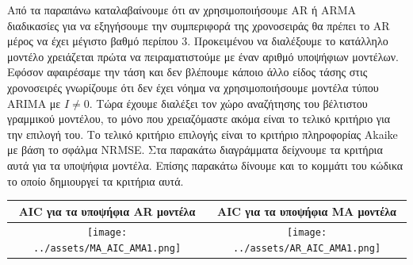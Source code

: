\documentclass[11pt,]{article}
\newenvironment{Shaded}{}{}
\newcommand{\CommentTok}[1]{\textcolor[rgb]{0.38,0.63,0.69}{\textit{#1}}}
\newcommand{\FloatTok}[1]{\textcolor[rgb]{0.25,0.63,0.44}{#1}}
\newcommand{\NormalTok}[1]{#1}
\newcommand{\StringTok}[1]{\textcolor[rgb]{0.25,0.44,0.63}{#1}}
\begin{document}
\begin{Shaded}
\end{Shaded}

Από τα παραπάνω καταλαβαίνουμε ότι αν χρησιμοποιήσουμε AR ή ARMA
διαδικασίες για να εξηγήσουμε την συμπεριφορά της χρονοσειράς θα πρέπει
το AR μέρος να έχει μέγιστο βαθμό περίπου 3. Προκειμένου να διαλέξουμε
το κατάλληλο μοντέλο χρειάζεται πρώτα να πειραματιστούμε με έναν αριθμό
υποψήφιων μοντέλων. Εφόσον αφαιρέσαμε την τάση και δεν βλέπουμε κάποιο
άλλο είδος τάσης στις χρονοσειρές γνωρίζουμε ότι δεν έχει νόημα να
χρησιμοποιήσουμε μοντέλα τύπου ARIMA με \(I \neq 0\). Τώρα έχουμε
διαλέξει τον χώρο αναζήτησης του βέλτιστου γραμμικού μοντέλου, το μόνο
που χρειαζόμαστε ακόμα είναι το τελικό κριτήριο για την επιλογή του. Το
τελικό κριτήριο επιλογής είναι το κριτήριο πληροφορίας Akaike με βάση το
σφάλμα NRMSE. Στα παρακάτω διαγράμματα δείχνουμε τα κριτήρια αυτά για τα
υποψήφια μοντέλα. Επίσης παρακάτω δίνουμε και το κομμάτι του κώδικα το
οποίο δημιουργεί τα κριτήρια αυτά.

\begin{longtable}[]{@{}cc@{}}
\toprule
AIC για τα υποψήφια AR μοντέλα & AIC για τα υποψήφια MA
μοντέλα\tabularnewline
\midrule
\endhead
\texttt{[image: ../assets/MA\_AIC\_AMA1.png]}
&
\texttt{[image: ../assets/AR\_AIC\_AMA1.png]}\tabularnewline
\bottomrule
\end{longtable}
\end{document}
